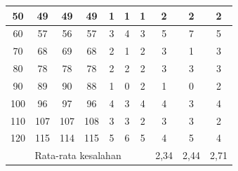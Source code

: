 \begin{atable}
\begin{tabular}{|c|c|c|c|c|c|c|c|c|c|}
    50                                 & 49            & 49           & 49           & 1             & 1             & 1            & 2            & 2            & 2           \\ \hline
    60                                 & 57            & 56           & 57           & 3             & 4             & 3            & 5            & 7            & 5           \\ \hline
    70                                 & 68            & 69           & 68           & 2             & 1             & 2            & 3            & 1            & 3           \\ \hline
    80                                 & 78            & 78           & 78           & 2             & 2             & 2            & 3            & 3            & 3           \\ \hline
    90                                 & 89            & 90           & 88           & 1             & 0             & 2            & 1            & 0            & 2           \\ \hline
    100                                & 96            & 97           & 96           & 4             & 3             & 4            & 4            & 3            & 4           \\ \hline
    110                                & 107           & 107          & 108          & 3             & 3             & 2            & 3            & 3            & 2           \\ \hline
    120                                & 115           & 114          & 115          & 5             & 6             & 5            & 4            & 5            & 4           \\ \hline
    \multicolumn{7}{|c|}{Rata-rata kesalahan}                                                                                       & 2,34         & 2,44         & 2,71        \\ \hline
    \end{tabular}
\end{atable}

